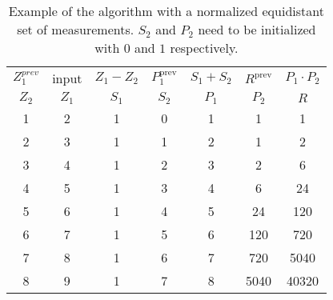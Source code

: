\begin{table}[H]
	\centering
	\begin{tabular}{ c c | c c | c c | c }
		$Z_1^{prev}$	& input	& $Z_1 - Z_2$	& $P_1^{\text{prev}}$	& $S_1 + S_2$		& $R^{\text{prev}}$	& $P_1 \cdot P_2$ \\
		$Z_2$		& $Z_1$	& $S_1$		& $S_2$			& $P_1$			& $P_2$			& $R$ \\ \hline
		1 & 2 & 1 & {\color{gray}0} & 1 & {\color{gray}1} & 1 \\
		2 & 3 & 1 & 1 & 2 & 1		& 2 \\
		3 & 4 & 1 & 2 & 3 & 2		& 6 \\
		4 & 5 & 1 & 3 & 4 & 6		& 24 \\
		5 & 6 & 1 & 4 & 5 & 24		& 120 \\
		6 & 7 & 1 & 5 & 6 & 120		& 720 \\
		7 & 8 & 1 & 6 & 7 & 720		& 5040 \\
		8 & 9 & 1 & 7 & 8 & 5040	& 40320 \\
	\end{tabular}
	\caption{Example of the algorithm with a normalized equidistant set of
		measurements. $S_2$ and $P_2$ need to be initialized with $0$
		and $1$ respectively.}
\end{table}


